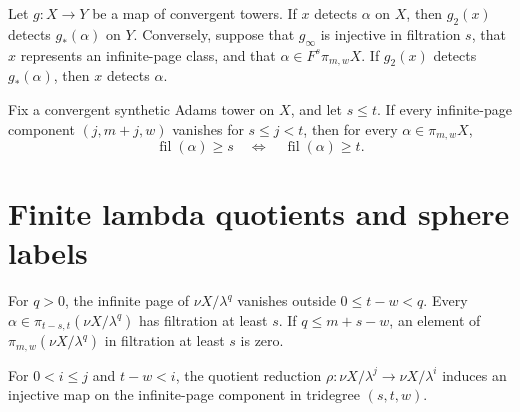 \begin{theorem}
\label{sem:ProofTools:detection-transport}
Let $g:X\to Y$ be a map of convergent towers. If $x$ detects $\alpha$ on $X$, then $g_2(x)$ detects $g_*(\alpha)$ on $Y$. Conversely, suppose that $g_\infty$ is injective in filtration $s$, that $x$ represents an infinite-page class, and that $\alpha\in F^s\pi_{m,w}X$. If $g_2(x)$ detects $g_*(\alpha)$, then $x$ detects $\alpha$.
\end{theorem}

\begin{theorem}
\label{sem:ProofTools:filtration-gap}
Fix a convergent synthetic Adams tower on $X$, and let $s\leq t$. If every infinite-page component $(j,m+j,w)$ vanishes for $s\leq j<t$, then for every $\alpha\in\pi_{m,w}X$,
\[\operatorname{fil}(\alpha)\geq s\quad\Longleftrightarrow\quad\operatorname{fil}(\alpha)\geq t.\]

\end{theorem}

\section{Finite lambda quotients and sphere labels}


\begin{theorem}
\label{sem:ProofTools:finite-strip}
For $q>0$, the infinite page of $\nu X/\lambda^q$ vanishes outside $0\leq t-w<q$. Every $\alpha\in\pi_{t-s,t}(\nu X/\lambda^q)$ has filtration at least $s$. If $q\leq m+s-w$, an element of $\pi_{m,w}(\nu X/\lambda^q)$ in filtration at least $s$ is zero.
\end{theorem}

\begin{theorem}
\label{sem:ProofTools:rho-injectivity}
For $0<i\leq j$ and $t-w<i$, the quotient reduction $\rho:\nu X/\lambda^j\to\nu X/\lambda^i$ induces an injective map on the infinite-page component in tridegree $(s,t,w)$.
\end{theorem}


